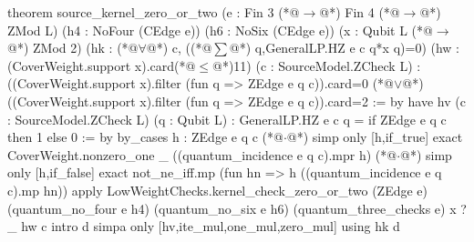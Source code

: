 theorem source_kernel_zero_or_two (e : Fin 3 (*@$\to$@*) Fin 4 (*@$\to$@*) ZMod L)
    (h4 : NoFour (CEdge e)) (h6 : NoSix (CEdge e))
    (x : Qubit L (*@$\to$@*) ZMod 2)
    (hk : (*@$\forall$@*) c, ((*@$\sum$@*) q,GeneralLP.HZ e c q*x q)=0)
    (hw : (CoverWeight.support x).card(*@$\le$@*)11) (c : SourceModel.ZCheck L) :
    ((CoverWeight.support x).filter (fun q => ZEdge e q c)).card=0 (*@$\lor$@*)
      ((CoverWeight.support x).filter (fun q => ZEdge e q c)).card=2 := by
  have hv (c : SourceModel.ZCheck L) (q : Qubit L) :
      GeneralLP.HZ e c q = if ZEdge e q c then 1 else 0 := by
    by_cases h : ZEdge e q c
    (*@$\cdot$@*) simp only [h,if_true]
      exact CoverWeight.nonzero_one _ ((quantum_incidence e q c).mpr h)
    (*@$\cdot$@*) simp only [h,if_false]
      exact not_ne_iff.mp (fun hn => h ((quantum_incidence e q c).mp hn))
  apply LowWeightChecks.kernel_check_zero_or_two (ZEdge e)
    (quantum_no_four e h4) (quantum_no_six e h6) (quantum_three_checks e) x ?_ hw c
  intro d
  simpa only [hv,ite_mul,one_mul,zero_mul] using hk d
